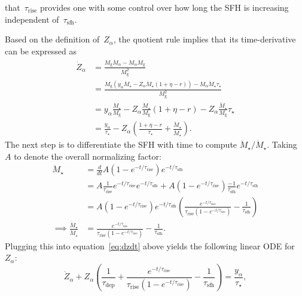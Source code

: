 \documentclass[12pt]{article}
\newcommand{\timescale}[1]{\ensuremath{\tau_\text{#1}}}
\begin{document}
that~$\timescale{rise}$ provides one with some control over how long the SFH is
increasing independent of~$\timescale{sfh}$.
\par
Based on the definition of~$Z_\alpha$, the quotient rule implies that its
time-derivative can be expressed as
\begin{subequations}\begin{align}
\dot{Z}_\alpha &= \frac{
	M_\text{g} \dot{M}_\alpha - M_\alpha \dot{M}_\text{g}
}{
	M_\text{g}^2
}
\\
&= \frac{
	M_\text{g} (y_\alpha \dot{M}_\star - Z_\alpha \dot{M}_\star (1 + \eta - r))
	- M_\alpha \ddot{M}_\star \tau_\star
}{
	M_\text{g}^2
}
\\
&= y_\alpha \frac{\dot{M}_\star}{M_\text{g}} -
Z_\alpha \frac{\dot{M}_\star}{M_\text{g}}(1 + \eta - r) -
Z_\alpha \frac{\ddot{M}_\star}{M_\text{g}} \tau_\star
\\
&= \frac{y_\alpha}{\tau_\star} -
Z_\alpha \left(\frac{1 + \eta - r}{\tau_\star} +
\frac{\ddot{M}_\star}{\dot{M}_\star}\right).
\label{eq:dzdt}
\end{align}\end{subequations}
The next step is to differentiate the SFH with time to compute
$\ddot{M}_\star / \dot{M}_\star$. Taking~$A$ to denote the overall normalizing
factor:
\begin{subequations}\begin{align}
\ddot{M}_\star &= \frac{d}{dt}
A(1 - e^{-t / \timescale{rise}}) e^{-t / \timescale{sfh}}
\\
&= A \frac{1}{\timescale{rise}}e^{-t / \timescale{rise}}
e^{-t / \timescale{sfh}} +
A(1 - e^{-t / \timescale{rise}}) \frac{-1}{\timescale{sfh}}
e^{-t / \timescale{sfh}}
\\
&= A(1 - e^{-t / \timescale{rise}})e^{-t / \timescale{sfh}}
\left(\frac{
	e^{-t / \timescale{rise}}
}{
	\timescale{rise}(1 - e^{-t / \timescale{rise}})
} - \frac{1}{\timescale{sfh}}
\right)
\\
\implies \frac{\ddot{M}_\star}{\dot{M}_\star} &= \frac{
	e^{-t / \timescale{rise}}
}{
	\timescale{rise}(1 - e^{-t / \timescale{rise}})
} - \frac{1}{\timescale{sfh}}.
\end{align}\end{subequations}
Plugging this into equation~\ref{eq:dzdt} above yields the following linear
ODE for~$Z_\alpha$:
\begin{equation}
\dot{Z}_\alpha + Z_\alpha \left(\frac{1}{\timescale{dep}} +
\frac{
	e^{-t / \timescale{rise}}
}{
	\timescale{rise}(1 - e^{-t / \timescale{rise}})
} - \frac{1}{\timescale{sfh}}\right) = \frac{y_\alpha}{\tau_\star},
\end{equation}
\end{document}
